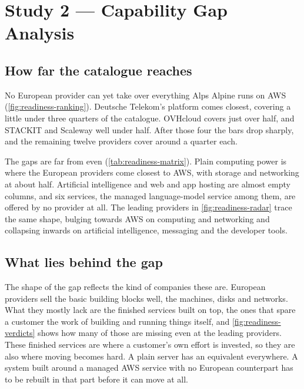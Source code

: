 \section{Study 2 --- Capability Gap Analysis}
\label{sec:study2}

\subsection{How far the catalogue reaches}
\label{subsec:study2-results}

No European provider can yet take over everything Alps Alpine runs on \acs{AWS}
(\cref{fig:readiness-ranking}). Deutsche Telekom's platform comes closest,
covering a little under three quarters of the catalogue. OVHcloud covers just
over half, and STACKIT and Scaleway well under half. After those four the bars
drop sharply, and the remaining twelve providers cover around a quarter each.

The gaps are far from even (\cref{tab:readiness-matrix}). Plain computing power
is where the European providers come closest to \acs{AWS}, with storage and
networking at about half. Artificial intelligence and web and app hosting are
almost empty columns, and six services, the managed language-model service among
them, are offered by no provider at all. The leading providers in
\cref{fig:readiness-radar} trace the same shape, bulging towards \acs{AWS} on
computing and networking and collapsing inwards on artificial intelligence,
messaging and the developer tools.

\subsection{What lies behind the gap}
\label{subsec:study2-interpretation}

The shape of the gap reflects the kind of companies these are. European providers
sell the basic building blocks well, the machines, disks and networks. What they
mostly lack are the finished services built on top, the ones that spare a
customer the work of building and running things itself, and
\cref{fig:readiness-verdicts} shows how many of those are missing even at the
leading providers. These finished services are where a customer's own effort is
invested, so they are also where moving becomes hard. A plain server has an
equivalent everywhere. A system built around a managed \acs{AWS} service with no
European counterpart has to be rebuilt in that part before it can move at all.

